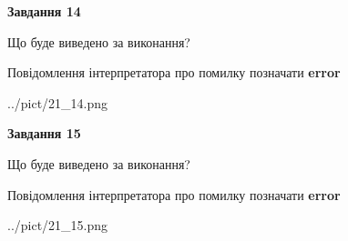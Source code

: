 \documentclass[11pt, ukrainian]{article}
\begin{document}
{\begin {large}
{\begin {center}\textbf{Завдання 14}\end {center}}\par
Що буде виведено за виконання? \par
Повідомлення інтерпретатора про помилку позначати \textbf{error}

\begin{center}
	{../pict/21_14.png}
\end{center}
\newpage

{\begin {center}\textbf{Завдання 15}\end {center}}\par
Що буде виведено за виконання? \par
Повідомлення інтерпретатора про помилку позначати \textbf{error}

\begin{center}
	{../pict/21_15.png}
\end{center}
\newpage

\end {large}}
\end{document}
